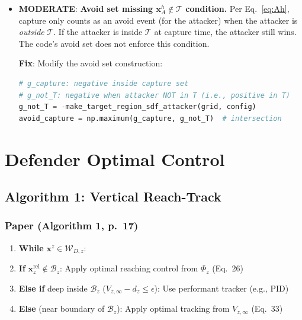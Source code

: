 \documentclass[11pt,a4paper]{article}
\begin{document}
\begin{itemize}
\item \textcolor{modoran}{\textbf{MODERATE}}: \textbf{Avoid set missing $\mathbf{x}^h_A \notin \mathcal{T}$ condition.} Per Eq.~\ref{eq:Ah}, capture only counts as an avoid event (for the attacker) when the attacker is \emph{outside} $\mathcal{T}$. If the attacker is inside $\mathcal{T}$ at capture time, the attacker still wins. The code's avoid set does not enforce this condition.

\textbf{Fix}: Modify the avoid set construction:
\begin{lstlisting}[language=Python]
# g_capture: negative inside capture set
# g_not_T: negative when attacker NOT in T (i.e., positive in T)
g_not_T = -make_target_region_sdf_attacker(grid, config)
avoid_capture = np.maximum(g_capture, g_not_T)  # intersection
\end{lstlisting}
\end{itemize}

\section{Defender Optimal Control}

\subsection{Algorithm 1: Vertical Reach-Track}

\subsubsection{Paper (Algorithm 1, p.~17)}

\begin{enumerate}[nosep]
\item \textbf{While} $\mathbf{x}^z \in \mathcal{W}_{D,z}$:
\item \quad \textbf{If} $\mathbf{x}^{\mathrm{rel}}_z \notin \mathcal{B}_z$: Apply optimal reaching control from $\Phi_z$ (Eq.~26)
\item \quad \textbf{Else if} deep inside $\mathcal{B}_z$ ($V_{z,\infty} - d_z \leq \epsilon$): Use performant tracker (e.g., PID)
\item \quad \textbf{Else} (near boundary of $\mathcal{B}_z$): Apply optimal tracking from $V_{z,\infty}$ (Eq.~33)
\end{enumerate}
\end{document}

